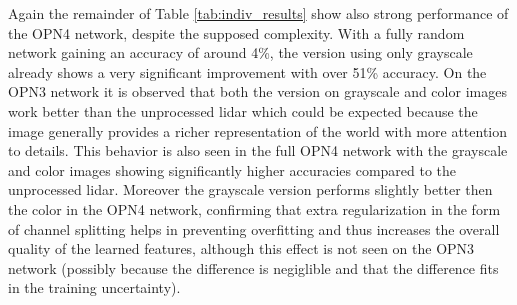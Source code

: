 Again the remainder of Table \ref{tab:indiv_results} show also strong performance of the OPN4 network, despite the supposed complexity. With a fully random network gaining an accuracy of around 4\%, the version using only grayscale already shows a very significant improvement with over 51\% accuracy. On the OPN3 network it is observed that both the version on grayscale and color images work better than the unprocessed lidar which could be expected because the image generally provides a richer representation of the world with more attention to details. This behavior is also seen in the full OPN4 network with the grayscale and color images showing significantly higher accuracies compared to the unprocessed lidar. Moreover the grayscale version performs slightly better then the color in the OPN4 network, confirming that extra regularization in the form of channel splitting helps in preventing overfitting and thus increases the overall quality of the learned features, although this effect is not seen on the OPN3 network (possibly because the difference is negiglible and that the difference fits in the training uncertainty).



